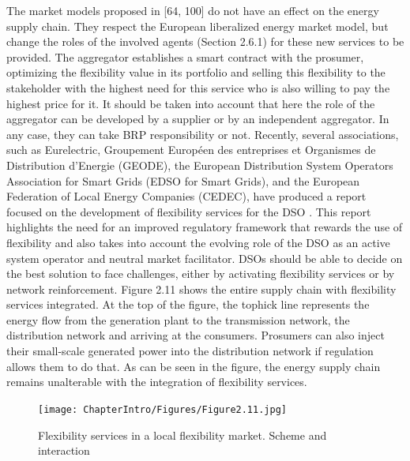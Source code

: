 The market models proposed in \cite{USEFFoundation2015a, MarketDesignENTSOE} [64, 100] do not have an effect on the energy supply chain. They respect the European liberalized energy market model, but change the roles of the involved agents (Section 2.6.1) for these new services to be provided. The aggregator establishes a smart contract with the prosumer, optimizing the flexibility value in its portfolio and selling this flexibility to the stakeholder with the highest need for this service who is also willing to pay the highest price for it. It should be taken into account that here the role of the aggregator can be developed by a supplier or by an independent aggregator. In any case, they can take BRP responsibility or not.
Recently, several associations, such as Eurelectric, Groupement Européen des entreprises et Organismes de Distribution d'Energie (GEODE), the European Distribution System Operators Association for Smart Grids (EDSO for Smart Grids), and the European Federation of Local Energy Companies (CEDEC), have produced a report focused on the development of flexibility services for the DSO \cite{edso2018flexibility}. This report highlights the need for an improved regulatory framework that rewards the use of flexibility and also takes into account the evolving role of the DSO as an active system operator and neutral market facilitator. DSOs should be able to decide on the best solution to face challenges, either by activating flexibility services or by network reinforcement.
Figure 2.11 shows the entire supply chain with flexibility services integrated. At the top of the figure, the tophick line represents the energy flow from the generation plant to the transmission network, the distribution network and arriving at the consumers. Prosumers can also inject their small-scale generated power into the distribution network if regulation allows them to do that. As can be seen in the figure, the energy supply chain remains unalterable with the integration of flexibility services.

\begin{figure}[]
	\centering
	\texttt{[image: ChapterIntro/Figures/Figure2.11.jpg]}
		\caption{Flexibility services in a local flexibility market. Scheme and interaction}  
\end{figure}

